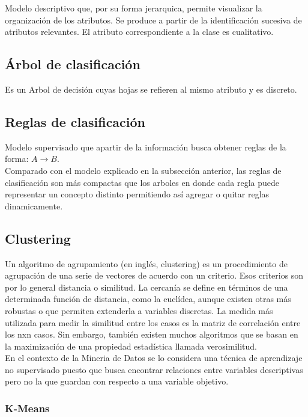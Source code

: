 \documentclass[osajnl,twocolumn,showpacs,superscriptaddress,10pt,floatfix]{revtex4-1} %
\begin{document}
Modelo descriptivo que, por su forma jerarquica, permite visualizar la organización de los atributos. Se produce a partir de la identificación sucesiva de atributos relevantes. El atributo correspondiente a la clase es cualitativo.

\subsection{Árbol de clasificación}

Es un Arbol de decisión cuyas hojas se refieren al mismo atributo y es discreto.

\subsection{Reglas de clasificación}

Modelo supervisado que apartir de la información busca obtener reglas de la forma: $ A \rightarrow B $. \\

Comparado con el modelo explicado en la subsección anterior, las reglas de clasificación son más compactas que los arboles en donde cada regla puede representar un concepto distinto permitiendo así agregar o quitar reglas dinamicamente.

\subsection{Clustering}

Un algoritmo de agrupamiento (en inglés, clustering) es un procedimiento de agrupación de una serie de vectores de acuerdo con un criterio. Esos criterios son por lo general distancia o similitud. La cercanía se define en términos de una determinada función de distancia, como la euclídea, aunque existen otras más robustas o que permiten extenderla a variables discretas. La medida más utilizada para medir la similitud entre los casos es la matriz de correlación entre los nxn casos. Sin embargo, también existen muchos algoritmos que se basan en la maximización de una propiedad estadística llamada verosimilitud. \\

En el contexto de la Mineria de Datos se lo considera una técnica de aprendizaje no supervisado puesto que busca encontrar relaciones entre variables descriptivas pero no la que guardan con respecto a una variable objetivo. \\

\subsubsection{K-Means}
\end{document}
